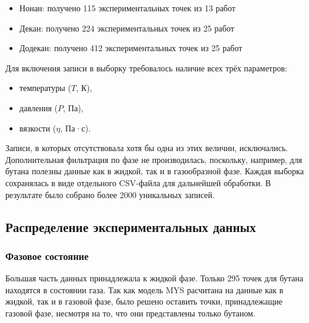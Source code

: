 \documentclass[a4paper,12pt]{article}
\begin{document}
\begin{itemize}
      \item Нонан: получено 115 экспериментальных точек из 13 работ \cite{acs.jced.7b00121,acs.jced.7b00650,j.fluid.2010.10.009,j.jct.2004.09.021,j.jct.2005.03.024,j.jct.2005.10.011,j.jct.2013.09.017,je200757a,je300899n,je400250u,je400835u,je700202h,je700428f}
      \item Декан: получено 224 экспериментальных точек из 25 работ \cite{acs.jced.5b00270,acs.jced.6b00542,acs.jced.7b00121,acs.jced.7b00650,j.fluid.2010.10.009,j.jct.2003.12.005,j.jct.2004.09.021,j.jct.2005.03.024,j.jct.2005.10.011,j.jct.2007.05.016,j.jct.2008.02.005,j.jct.2013.05.014,j.jct.2013.09.017,je034208m,je0501585,je060389r,je300899n,je400250u,je400835u,je4008926,je800348s,je800417q,je800635g,s10765-005-5572-8,s10765-008-0542-6}
      \item Додекан: получено 412 экспериментальных точек из 25 работ \cite{acs.jced.6b00391,acs.jced.6b00542,acs.jced.6b00688,acs.jced.7b00201,acs.jced.7b00466,acs.jced.7b00650,acs.jced.7b00866,acs.jced.8b00008,acs.jced.8b00438,acs.jced.8b01135,acs.jced.8b01233,acs.jced.9b00187,j.fluid.2015.07.022,j.jct.2003.12.005,j.jct.2004.09.021,j.jct.2005.03.024,j.jct.2013.12.022,j.jct.2014.02.012,j.jct.2015.12.021,je034208m,je060491o,je200757a,je400493x,je400835u,je5000132}
    \end{itemize}
    
    Для включения записи в выборку требовалось наличие всех трёх параметров:
    \begin{itemize}
      \item температуры (\( T \), К),
      \item давления (\( P \), Па),
      \item вязкости (\( \eta \), Па·с).
    \end{itemize}
    
    Записи, в которых отсутствовала хотя бы одна из этих величин, исключались. Дополнительная фильтрация по фазе не производилась, поскольку, например, для бутана полезны данные как в жидкой, так и в газообразной фазе. Каждая выборка сохранялась в виде отдельного CSV-файла для дальнейшей обработки. В результате было собрано более 2000 уникальных записей.

  \subsection{Распределение экспериментальных данных}
    \subsubsection{Фазовое состояние}
      Большая часть данных принадлежала к жидкой фазе. Только 295 точек для бутана находятся в состоянии газа. Так как модель MYS расчитана на данные как в жидкой, так и в газовой фазе, было решено оставить точки, принадлежащие газовой фазе, несмотря на то, что они представлены только бутаном.
\end{document}
